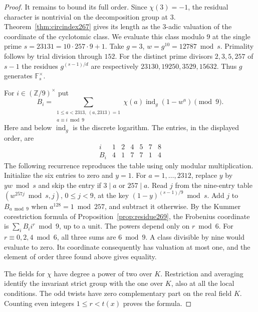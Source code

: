 \documentclass[a4paper,11pt]{article}
\theoremstyle{definition}
\theoremstyle{remark}
\newcommand{\ZZ}{\mathbb Z}\newcommand{\ord}{\operatorname{ord}}
\numberwithin{equation}{section}
\begin{document}
\begin{proof}
It remains to bound its full order. Since \(\chi(3)=-1\), the
residual character is nontrivial on the decomposition group at
\(3\). Theorem~\ref{thm:circindex267} gives its length as the
\(3\)-adic valuation of the coordinate of the cyclotomic class.
We evaluate this class modulo \(9\) at the single prime
\(s=23131=10\cdot257\cdot9+1\).
Take \(g=3\), \(w=g^{10}=12787\bmod s\).
Primality follows by trial division through \(152\).
For the distinct prime divisors \(2,3,5,257\) of \(s-1\)
the residues \(g^{(s-1)/d}\) are respectively
\(23130,19250,3529,15632\). Thus \(g\) generates
\(\mathbb F_s^\times\).

For \(i\in(\ZZ/9)^\times\) put
\[
 B_i=\sum_{\substack{1\le a<2313,\ (a,2313)=1\\a\equiv i\bmod9}}
             \chi(a)\operatorname{ind}_g(1-w^a)\pmod9 .
\]
Here and below \(\operatorname{ind}_g\) is the discrete logarithm.
The entries, in the displayed order, are
\[
 \begin{array}{c|rrrrrr}
 i&1&2&4&5&7&8\\ \hline
 B_i&4&1&7&7&1&4
 \end{array}
\]
The following recurrence reproduces the table using only
modular multiplication. Initialize the six entries to zero
and \(y=1\). For \(a=1,\ldots,2312\), replace \(y\) by
\(yw\bmod s\) and skip the entry if \(3\mid a\) or \(257\mid a\).
Read \(j\) from the nine-entry table
\((w^{257j}\bmod s,j)\), \(0\le j<9\), at the key
\((1-y)^{(s-1)/9}\bmod s\). Add \(j\) to \(B_{a\bmod9}\)
when \(a^{128}=1\bmod257\), and subtract it otherwise.
By the Kummer corestriction formula of
Proposition~\ref{prop:residue269}, the Frobenius coordinate is
\(\sum_iB_i i^r\bmod9\), up to a unit. The powers depend only
on \(r\bmod6\). For \(r\equiv0,2,4\bmod6\), all three sums
are \(6\bmod9\). A class divisible by nine would evaluate to
zero. Its coordinate consequently has valuation at most one,
and the element of order three found above gives equality.

The fields for \(\chi\) have degree a power of two over \(K\).
Restriction and averaging identify the invariant strict group
with the one over \(K\), also at all the local conditions.
The odd twists have zero complementary part on the real
field \(K\). Counting even integers \(1\le r<t(x)\) proves
the formula.
\end{proof}
\end{document}
